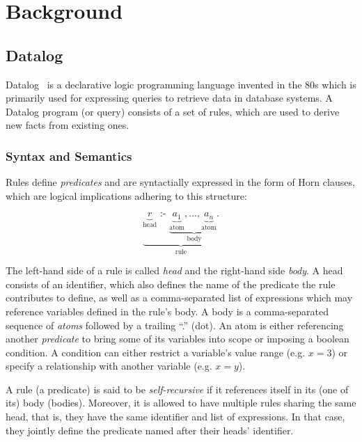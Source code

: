 
\chapter{Background}\label{ch:background}

\section{Datalog}\label{sec:datalog}

Datalog~\cite{green2013datalog} is a declarative logic programming language
invented in the 80s which is primarily used for expressing queries to retrieve
data in database systems.
A Datalog program (or query) consists of a set of rules, which are used to
derive new facts from existing ones.

\subsection{Syntax and Semantics}\label{sec:datalog-syntax-semantics}

Rules define \emph{predicates} and are syntactially expressed in the form of
Horn clauses, which are logical implications adhering to this structure:

\begin{equation}
	\underbrace{
	\underbrace{r}_{\text{head}}
	\text{ :- }
	\underbrace{
	\underbrace{a_1}_{\text{atom}},
	\ldots,
	\underbrace{a_n}_{\text{atom}}.
	}_{\text{body}}
	}_{\text{rule}}
\end{equation}

The left-hand side of a rule is called \emph{head} and the right-hand side \emph{body}.
A head consists of an identifier, which also defines the name of the predicate
the rule contributes to define, as well as a comma-separated list of expressions
which may reference variables defined in the rule's body.
A body is a comma-separated sequence of \emph{atoms} followed by a trailing ``.'' (dot).
An atom is either referencing another \emph{predicate} to bring some of its
variables into scope or imposing a boolean condition.
A condition can either restrict a variable's value range (e.g. \(x = 3\))
or specify a relationship with another variable (e.g. \(x = y\)).

A rule (a predicate) is said to be \emph{self-recursive}
if it references itself in its (one of its) body (bodies).
Moreover, it is allowed to have multiple rules sharing the same head, that is,
they have the same identifier and list of expressions.
In that case, they jointly define the predicate named after their heads' identifier.

